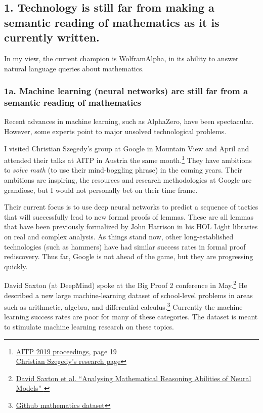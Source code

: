 \documentclass[12pt]{amsart}
\renewcommand{\~}{\ }
\renewcommand{\_}{\textunderscore}
\begin{document}
\subsection*{1. Technology is still far from making
a semantic reading of mathematics as it is currently written.}

In my view, the current champion is WolframAlpha, in its ability
to answer natural language queries about mathematics.

\subsubsection*{1a. Machine learning (neural networks) are still far from a semantic reading
of mathematics}

Recent advances in machine learning, such as AlphaZero, have been
spectacular.  However, some experts point to major unsolved
technological problems.

I visited Christian Szegedy's group at Google in Mountain View and
April and attended their talks at AITP in Austria the same
month.\footnote{\href{http://aitp-conference.org/2019/aitp19-proceedings.pdf}{AITP
    2019 proceedings}, page 19
  \\ \href{https://ai.google/research/people/ChristianSzegedy}{Christian
    Szegedy's research page}} They have ambitions to {\it solve math}
(to use their mind-boggling phrase) in the coming years.  Their
ambitions are inspiring, the resources and research methodologies at
Google are grandiose, but I would not personally bet on their time
frame.

Their current focus is to use deep neural networks to predict a
sequence of tactics that will successfully lead to new formal proofs
of lemmas.  These are all lemmas that have been previously formalized
by John Harrison in his HOL Light libraries on real and complex
analysis.  As things stand now, other long-established technologies
(such as hammers) have had similar success rates in formal proof
rediscovery.  Thus far, Google is not ahead of the game, but they are
progressing quickly.

David Saxton (at DeepMind) spoke at the Big Proof 2 conference in
May.\footnote{\href{https://arxiv.org/abs/1904.01557}{David Saxton et
    al. ``Analysing Mathematical Reasoning Abilities of Neural
    Models'' }} He described a new large machine-learning dataset of
school-level problems in areas such as arithmetic, algebra, and
differential
calculus.\footnote{\href{https://github.com/deepmind/mathematics_dataset}{Github
    mathematics dataset}} Currently the machine learning success rates
are poor for many of these categories.  The dataset is meant to
stimulate machine learning research on these topics.
\end{document}
